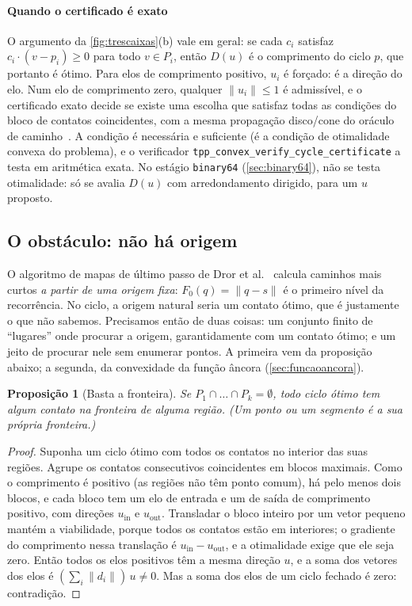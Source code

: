 \documentclass[11pt,a4paper]{article}
\theoremstyle{plain}\newtheorem{proposicao}{Proposição}
\theoremstyle{definition}\newtheorem{definicao}{Definição}
\theoremstyle{plain}\newtheorem{teorema}{Teorema}
\theoremstyle{plain}\newtheorem{lema}{Lema}
\newcommand{\norm}[1]{\lVert#1\rVert}
\newcommand{\code}[1]{\texttt{\small #1}}
\begin{document}
\paragraph{Quando o certificado é exato} O argumento da \cref{fig:trescaixas}(b) vale em geral: se cada \(c_i\) satisfaz \(c_i\cdot(v-p_i)\ge0\) para todo \(v\in P_i\), então \(D(u)\) é o comprimento do ciclo \(p\), que portanto é ótimo. Para elos de comprimento positivo, \(u_i\) é forçado: é a direção do elo. Num elo de comprimento zero, qualquer \(\norm{u_i}\le1\) é admissível, e o certificado exato decide se existe uma escolha que satisfaz todas as condições do bloco de contatos coincidentes, com a mesma propagação disco/cone do oráculo de caminho~\cite{oraculo,certificadociclo}. A condição é necessária e suficiente (é a condição de otimalidade convexa do problema), e o verificador \code{tpp\_convex\_verify\_cycle\_certificate} a testa em aritmética exata. No estágio \texttt{binary64} (\cref{sec:binary64}), não se testa otimalidade: só se avalia \(D(u)\) com arredondamento dirigido, para um \(u\) proposto.

\subsection{O obstáculo: não há origem}
O algoritmo de mapas de último passo de Dror et al.~\cite{dror} calcula caminhos mais curtos \emph{a partir de uma origem fixa}: \(F_0(q)=\norm{q-s}\) é o primeiro nível da recorrência. No ciclo, a origem natural seria um contato ótimo, que é justamente o que não sabemos. Precisamos então de duas coisas: um conjunto finito de ``lugares'' onde procurar a origem, garantidamente com um contato ótimo; e um jeito de procurar nele sem enumerar pontos. A primeira vem da proposição abaixo; a segunda, da convexidade da função âncora (\cref{sec:funcaoancora}).

\begin{proposicao}[Basta a fronteira]\label{prop:fronteira}
Se \(P_1\cap\dots\cap P_k=\emptyset\), todo ciclo ótimo tem algum contato na fronteira de alguma região. (Um ponto ou um segmento é a sua própria fronteira.)
\end{proposicao}
\begin{proof}
Suponha um ciclo ótimo com todos os contatos no interior das suas regiões. Agrupe os contatos consecutivos coincidentes em blocos maximais. Como o comprimento é positivo (as regiões não têm ponto comum), há pelo menos dois blocos, e cada bloco tem um elo de entrada e um de saída de comprimento positivo, com direções \(u_{\text{in}}\) e \(u_{\text{out}}\). Transladar o bloco inteiro por um vetor pequeno mantém a viabilidade, porque todos os contatos estão em interiores; o gradiente do comprimento nessa translação é \(u_{\text{in}}-u_{\text{out}}\), e a otimalidade exige que ele seja zero. Então todos os elos positivos têm a mesma direção \(u\), e a soma dos vetores dos elos é \((\sum_i\norm{d_i})\,u\ne0\). Mas a soma dos elos de um ciclo fechado é zero: contradição.
\end{proof}
\end{document}
